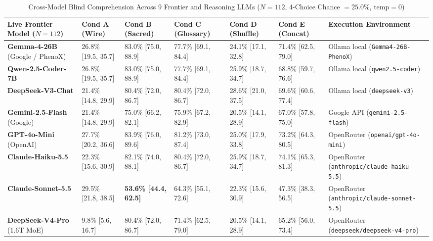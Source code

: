 \documentclass[9pt,a4paper]{extarticle}
\begin{document}
\begin{table}[h!]
\centering
\caption{Cross-Model Blind Comprehension Across 9 Frontier and Reasoning LLMs ($N = 112$, 4-Choice Chance $= 25.0\%$, $\text{temp}=0$)}
\label{tab:comprehension_results}
\scriptsize
\renewcommand{\arraystretch}{0.82}
\setlength{\tabcolsep}{3.2pt}
\begin{tabularx}{\textwidth}{L{4.2cm} C{2.2cm} C{2.2cm} C{2.2cm} C{2.2cm} C{2.2cm} Y}
\toprule
{}
\textbf{\color{white}Live Frontier Model ($N=112$)} &
\textbf{\color{white}Cond A (Wire)} &
\textbf{\color{white}Cond B (Sacred)} &
\textbf{\color{white}Cond C (Glossary)} &
\textbf{\color{white}Cond D (Shuffle)} &
\textbf{\color{white}Cond E (Concat)} &
\textbf{\color{white}Execution Environment} \\
\midrule
\textbf{Gemma-4-26B} (Google / PhenoX) & 26.8\% [19.5, 35.7] & 83.0\% [75.0, 88.9] & 77.7\% [69.1, 84.4] & 24.1\% [17.1, 32.8] & 71.4\% [62.5, 79.0] & Ollama local (\texttt{Gemma4-26B-PhenoX}) \\
\textbf{Qwen-2.5-Coder-7B} & 26.8\% [19.5, 35.7] & 83.0\% [75.0, 88.9] & 77.7\% [69.1, 84.4] & 25.9\% [18.7, 34.7] & 68.8\% [59.7, 76.6] & Ollama local (\texttt{qwen2.5-coder}) \\
\textbf{DeepSeek-V3-Chat} & 21.4\% [14.8, 29.9] & 80.4\% [72.0, 86.7] & 80.4\% [72.0, 86.7] & 28.6\% [21.0, 37.5] & 69.6\% [60.6, 77.4] & Ollama local (\texttt{deepseek-v3}) \\
\textbf{Gemini-2.5-Flash} (Google) & 21.4\% [14.8, 29.9] & 75.0\% [66.2, 82.1] & 75.9\% [67.2, 82.9] & 20.5\% [14.1, 28.9] & 67.0\% [57.8, 75.0] & Google API (\texttt{gemini-2.5-flash}) \\
\textbf{GPT-4o-Mini} (OpenAI) & 27.7\% [20.2, 36.6] & 83.9\% [76.0, 89.6] & 81.2\% [73.0, 87.4] & 25.0\% [17.9, 33.8] & 73.2\% [64.3, 80.5] & OpenRouter (\texttt{openai/gpt-4o-mini}) \\
\textbf{Claude-Haiku-5.5} & 22.3\% [15.6, 30.9] & 82.1\% [74.0, 88.1] & 80.4\% [72.0, 86.7] & 25.9\% [18.7, 34.7] & 74.1\% [65.3, 81.3] & OpenRouter (\texttt{anthropic/claude-haiku-5.5}) \\
\textbf{Claude-Sonnet-5.5} & 29.5\% [21.8, 38.5] & \textbf{53.6\% [44.4, 62.5]} & 64.3\% [55.1, 72.6] & 22.3\% [15.6, 30.9] & 47.3\% [38.3, 56.5] & OpenRouter (\texttt{anthropic/claude-sonnet-5.5}) \\
\textbf{DeepSeek-V4-Pro} (1.6T MoE) & 9.8\% [5.6, 16.7] & 80.4\% [72.0, 86.7] & 71.4\% [62.5, 79.0] & 20.5\% [14.1, 28.9] & 65.2\% [56.0, 73.4] & OpenRouter (\texttt{deepseek/deepseek-v4-pro}) \\

\end{tabularx}
\end{table}
\end{document}

